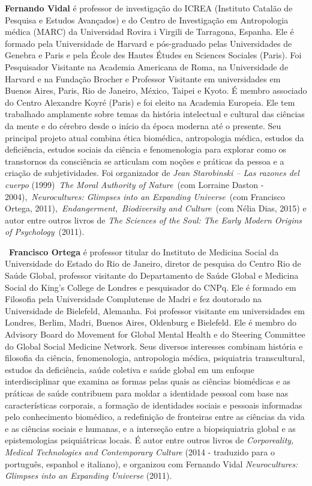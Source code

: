 \textbf{Fernando Vidal} é professor de investigação do ICREA (Instituto
Catalão de Pesquisa e Estudos Avançados) e do Centro de Investigação em
Antropologia médica (MARC) da Universidad Rovira i Virgili de Tarragona,
Espanha. Ele é formado pela Universidade de Harvard e pós-graduado pelas
Universidades de Genebra e Paris e pela École des Hautes Études en
Sciences Sociales (Paris). Foi Pesquisador Visitante na Academia
Americana de Roma, na Universidade de Harvard e na Fundação Brocher e
Professor Visitante em universidades em Buenos Aires, Paris, Rio de
Janeiro, México, Taipei e Kyoto. É membro associado do Centro Alexandre
Koyré (Paris) e foi eleito na Academia Europeia. Ele tem trabalhado
amplamente sobre temas da história intelectual e cultural das ciências
da mente e do cérebro desde o início da época moderna até o presente.
Seu principal projeto atual combina ética biomédica, antropologia
médica, estudos da deficiência, estudos sociais da ciência e
fenomenologia para explorar como os transtornos da consciência se
articulam com noções e práticas da pessoa e a criação de subjetividades.
Foi organizador de \emph{Jean Starobinski -- Las razones del cuerpo}
(1999)~\emph{The Moral Authority of Nature}~(com Lorraine Daston -
2004),~\emph{Neurocultures: Glimpses into an Expanding Universe~}(com
Francisco Ortega, 2011),~\emph{Endangerment,~Biodiversity and
Culture}~(com Nélia Dias, 2015) e autor entre outros livros de \emph{The
Sciences of the Soul: The Early Modern Origins of Psychology}~(2011).

~\textbf{Francisco Ortega} é professor titular do Instituto de Medicina
Social da Universidade do Estado do Rio de Janeiro, diretor de pesquisa
do Centro Rio de Saúde Global, professor visitante do Departamento de
Saúde Global e Medicina Social do King's College de Londres e
pesquisador do CNPq. Ele é formado em Filosofia pela Universidade
Complutense de Madri e fez doutorado na Universidade de Bielefeld,
Alemanha. Foi professor visitante em universidades em Londres, Berlim,
Madri, Buenos Aires, Oldenburg e Bielefeld. Ele é membro do Advisory
Board do Movement for Global Mental Health e do Steering Committee do
Global Social Medicine Network. Seus diversos interesses combinam
história e filosofia da ciência, fenomenologia, antropologia médica,
psiquiatria transcultural, estudos da deficiência, saúde coletiva e
saúde global em um enfoque interdisciplinar que examina as formas pelas
quais as ciências biomédicas e as práticas de saúde contribuem para
moldar a identidade pessoal com base nas características corporais, a
formação de identidades sociais e pessoais informadas pelo conhecimento
biomédico, a redefinição de fronteiras entre as ciências da vida e as
ciências sociais e humanas, e a interseção entre a biopsiquiatria global
e as epistemologias psiquiátricas locais. É autor entre outros livros de
\emph{Corporeality, Medical Technologies and Contemporary Culture} (2014
- traduzido para o português, espanhol e italiano), e organizou com
Fernando Vidal \emph{Neurocultures: Glimpses into an Expanding Universe}
(2011).
